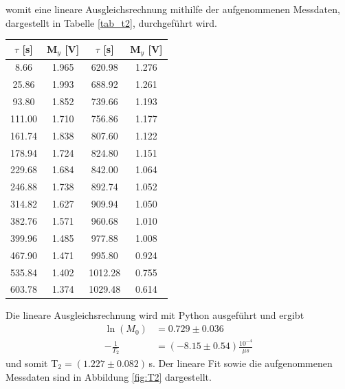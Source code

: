 \documentclass[]{scrartcl}
\begin{document}
womit eine lineare Ausgleichsrechnung mithilfe der aufgenommenen Messdaten, dargestellt in Tabelle \ref{tab_t2}, durchgeführt wird. \\
\begin{center}
	\begin{tabular}{|c|c||c|c|}
		\hline	$\tau$ [s]	&	M$_y$ [V] & $\tau$ [s]	&	M$_y$ [V]\\
		\hline	8.66	&	1.965	&	620.98	&	1.276	\\
		\hline	25.86	&	1.993	&	688.92	&	1.261	\\
		\hline	93.80	&	1.852	&	739.66	&	1.193	\\
		\hline	111.00	&	1.710	&	756.86	&	1.177	\\
		\hline	161.74	&	1.838	&	807.60	&	1.122	\\
		\hline	178.94	&	1.724	&	824.80	&	1.151	\\
		\hline	229.68	&	1.684	&	842.00	&	1.064	\\
		\hline	246.88	&	1.738	&	892.74	&	1.052	\\
		\hline	314.82	&	1.627	&	909.94	&	1.050	\\
		\hline	382.76	&	1.571	&	960.68	&	1.010	\\
		\hline	399.96	&	1.485	&	977.88	&	1.008	\\
		\hline	467.90	&	1.471	&	995.80	&	0.924	\\
		\hline	535.84	&	1.402	&	1012.28	&	0.755	\\
		\hline	603.78	&	1.374	&	1029.48	&	0.614	\\
		\hline
	\end{tabular}
	\label{tab_t2}
\end{center}
Die lineare Ausgleichsrechnung wird mit Python ausgeführt und ergibt 
\begin{align*}
\ln(M_0)&=0.729 \pm 0.036 \\
-\frac{1}{T_2}&= (-8.15 \pm 0.54) \frac{10^{-4}}{\mu s}
\end{align*}
und somit T$_2=(1.227 \pm 0.082)\,$s.
Der lineare Fit sowie die aufgenommenen Messdaten sind in Abbildung \ref{fig:T2} dargestellt.
\end{document}

